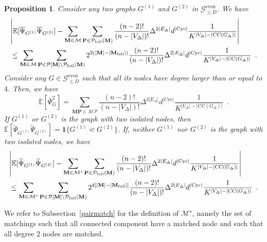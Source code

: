 \documentclass{article}
\newtheorem{proposition}{Proposition}
\begin{document}
\begin{proposition}\label{prop:covariance_generaltilde}
    Consider any two graphs $G^{(1)}$ and $G^{(2)}$ in $\mathcal G_{\leq D}^{\mathrm{even}}$. 
    We have  
    \begin{eqnarray}\nonumber
    \lefteqn{\left|\mathbb{E}[\overline{\Psi}_{G^{(1)}} \overline{\Psi}_{G^{(2)}}] - \sum_{\mathbf{M}\in \mathcal{M}}\sum_{\mathbf{P}\in  \mathcal{P}_{\mathrm{full}}(\mathbf{M})}\frac{(n-2)!}{(n - |V_{\Delta}| )!}\Delta^{2|E_{\Delta}|}d^{|\mathrm{Cyc}|}\frac{1}{K^{|V_{\Delta}|-|\mathrm{CC}(G_{\Delta})|}}  \right|} &\\
    &\leq  \sum_{\mathbf{M} \in \mathcal{M}} \sum_{\mathbf{P}\in \mathcal{P}[\mathbf{M}]\setminus \mathcal{P}_{\mathrm{full}}(\mathbf{M})}2^{2(|\mathbf{M}|-|\mathbf{M}_{\mathrm{full}}|) } \frac{(n-2)!}{(n-|V_{\Delta}|)!} \Delta^{2|E_{\Delta}|}d^{|\mathrm{Cyc}|}\frac{1}{K^{|V_{\Delta}|-|\mathrm{CC}(G_{\Delta})|}} \enspace .\label{eq:moment_order_2}
    \end{eqnarray}
Consider any $G \in \mathcal G_{\leq D}^{\mathrm{even}}$ such that all its nodes have degree larger than or equal to $4$. Then, we have
\begin{equation}\label{eq:formula_variance}
    \mathbb{E}[\overline{\Psi}_{G}^2] 
    =  \sum_{\mathbf{M}\mathbf{P} \in \mathcal{MP}}  \frac{(n-2)!}{(n-|V_{\Delta}|)!} \Delta^{2|E_{\Delta}|}d^{|\mathrm{Cyc}|}\frac{1}{K^{|V_{\Delta}|-|\mathrm{CC}(G_{\Delta})|}}\enspace .
\end{equation}
If $G^{(1)}$ or $G^{(2)}$ is the graph with two isolated nodes, then $\mathbb{E}[\widetilde{\Psi}_{G^{(1)}} \widetilde{\Psi}_{G^{(2)}}] = \mathbf{1}\{G^{(1)}\backsimeq  G^{(2)}\}$. 
If, neither $G^{(1)}$ nor $G^{(2)}$ is the graph with two isolated nodes, we have 
\begin{eqnarray}\nonumber
    \lefteqn{\left|\mathbb{E}[\widetilde{\Psi}_{G^{(1)}} \widetilde{\Psi}_{G^{(2)}}] - \sum_{\mathbf{M}\in \mathcal{M}^{\star}}\sum_{\mathbf{P}\in  \mathcal{P}_{\mathrm{full}}(\mathbf{M})}\frac{(n-2)!}{(n - |V_{\Delta}|)!}\Delta^{2|E_{\Delta}|}d^{|\mathrm{Cyc}|}\frac{1}{K^{|V_{\Delta}|-|\mathrm{CC}(G_{\Delta})|}}  \right|} &\\
    &\leq  \sum_{\mathbf{M} \in \mathcal{M}^{\star}} \sum_{\mathbf{P}\in \mathcal{P}[\mathbf{M}]\setminus \mathcal{P}_{\mathrm{full}}(\mathbf{M})} 2^{4[|\mathbf{M}|- |\mathbf{M}_{\mathrm{full}}|]} \frac{(n-2)!}{(n-|V_{\Delta}|)!} \Delta^{2|E_{\Delta}|}d^{|\mathrm{Cyc}|}\frac{1}{K^{|V_{\Delta}|-|\mathrm{CC}(G_{\Delta})|}}\enspace .\label{eq:covariance_tilde} 
    \end{eqnarray}
   \end{proposition}
   We refer to Subsection~\ref{pairmatch} for the definition of $\mathcal{M}^{\star}$, namely the set of matchings such that all connected component have a matched node and such that all degree $2$ nodes are matched.
\end{document}
